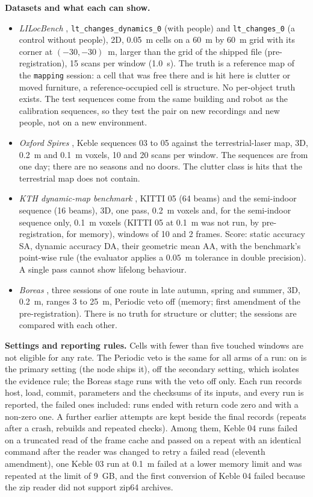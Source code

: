 \noindent\textbf{Datasets and what each can show.}
\begin{itemize}
  \item \emph{LILocBench} \citep{trekel2025lilocbench}, \texttt{lt\_changes\_dynamics\_0} (with people) and \texttt{lt\_changes\_0} (a control without people), 2D, 0.05~m cells on a 60~m by 60~m grid with its corner at $(-30,-30)$~m, larger than the grid of the shipped file (pre-registration), 15 scans per window (1.0~s). The truth is a reference map of the \texttt{mapping} session: a cell that was free there and is hit here is clutter or moved furniture, a reference-occupied cell is structure. No per-object truth exists. The test sequences come from the same building and robot as the calibration sequences, so they test the pair on new recordings and new people, not on a new environment.
  \item \emph{Oxford Spires} \citep{tao2024spires}, Keble sequences 03 to 05 against the terrestrial-laser map, 3D, 0.2~m and 0.1~m voxels, 10 and 20 scans per window. The sequences are from one day; there are no seasons and no doors. The clutter class is hits that the terrestrial map does not contain.
  \item \emph{KTH dynamic-map benchmark} \citep{zhang2023dynamic}, KITTI 05 (64 beams) and the semi-indoor sequence (16 beams), 3D, one pass, 0.2~m voxels and, for the semi-indoor sequence only, 0.1~m voxels (KITTI 05 at 0.1~m was not run, by pre-registration, for memory), windows of 10 and 2 frames. Score: static accuracy SA, dynamic accuracy DA, their geometric mean AA, with the benchmark's point-wise rule (the evaluator applies a $0.05$~m tolerance in double precision). A single pass cannot show lifelong behaviour.
  \item \emph{Boreas} \citep{burnett2022boreas}, three sessions of one route in late autumn, spring and summer, 3D, 0.2~m, ranges 3 to 25~m, Periodic veto off (memory; first amendment of the pre-registration). There is no truth for structure or clutter; the sessions are compared with each other.
\end{itemize}

\noindent\textbf{Settings and reporting rules.} Cells with fewer than five touched windows are not eligible for any rate. The Periodic veto is the same for all arms of a run: on is the primary setting (the node ships it), off the secondary setting, which isolates the evidence rule; the Boreas stage runs with the veto off only. Each run records host, load, commit, parameters and the checksums of its inputs, and every run is reported, the failed ones included: \PtRunsOk{} runs ended with return code zero and \PtRunsBad{} with a non-zero one. A further \PtAttempts{} earlier attempts are kept beside the final records (repeats after a crash, rebuilds and repeated checks). Among them, \PtRepeatOk{} Keble 04 runs failed on a truncated read of the frame cache and passed on a repeat with an identical command after the reader was changed to retry a failed read (eleventh amendment), one Keble 03 run at 0.1~m failed at a lower memory limit and was repeated at the limit of $9$~GB, and the first conversion of Keble 04 failed because the zip reader did not support zip64 archives.

